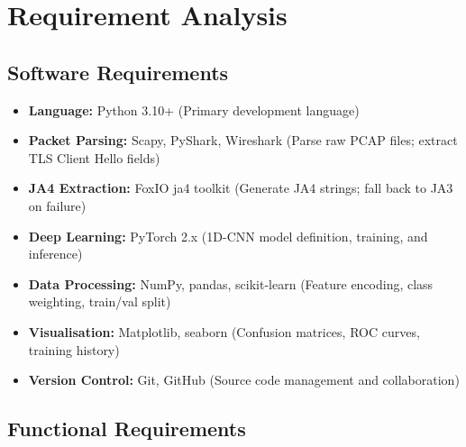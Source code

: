 \documentclass[12pt,a4paper]{report}
\begin{document}
\chapter{Requirement Analysis}

\section{Software Requirements}

\begin{itemize}
  \item \textbf{Language:} Python 3.10+ (Primary development language)
  \item \textbf{Packet Parsing:} Scapy, PyShark, Wireshark (Parse raw PCAP files; extract TLS Client Hello fields)
  \item \textbf{JA4 Extraction:} FoxIO ja4 toolkit (Generate JA4 strings; fall back to JA3 on failure)
  \item \textbf{Deep Learning:} PyTorch 2.x (1D-CNN model definition, training, and inference)
  \item \textbf{Data Processing:} NumPy, pandas, scikit-learn (Feature encoding, class weighting, train/val split)
  \item \textbf{Visualisation:} Matplotlib, seaborn (Confusion matrices, ROC curves, training history)
  \item \textbf{Version Control:} Git, GitHub (Source code management and collaboration)
\end{itemize}

\section{Functional Requirements}
\end{document}
